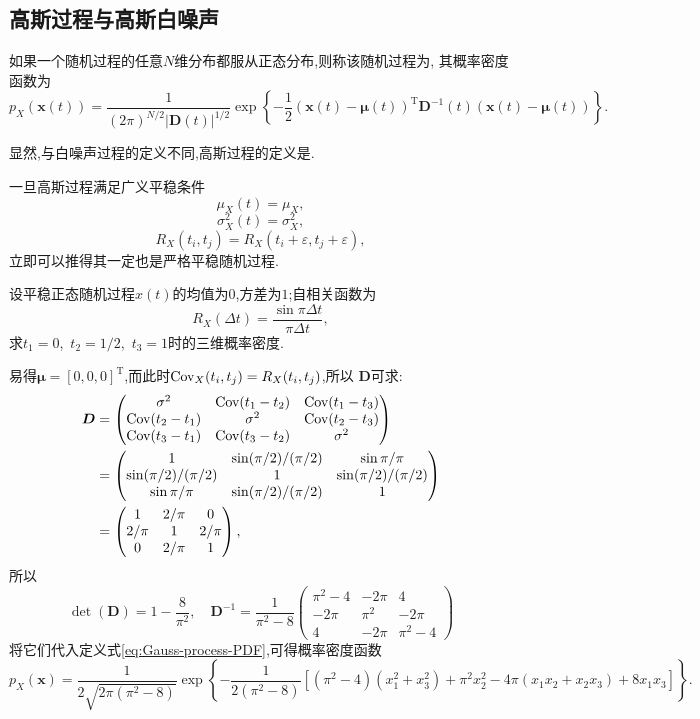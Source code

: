\documentclass[cn,10pt,citestyle=gb7714-2015,bibstyle=gb7714-2015]{elegantbook}
\newcommand{\mT}{\mathrm{T}}
\newcommand{\Cov}{\textup{Cov}}
\begin{document}
\subsection{高斯过程与高斯白噪声}
\begin{definition}[高斯过程]\label{def:Gaussian-process}
  如果一个随机过程的任意$N$维分布都服从正态分布,则称该随机过程为,
  其概率密度函数为
  \begin{equation}\label{eq:Gauss-process-PDF}
    p_X(\bm{x}(t))=\frac{1}{(2\pi)^{N/2}|\bm{D}(t)|^{1/2}}\exp\left\{-\frac12(\bm{x}(t)-\bm{\mu}(t))^\mT\bm{D}^{-1}(t)(\bm{x}(t)-\bm{\mu}(t))\right\}.
  \end{equation}
\end{definition}
\begin{note}
  显然,与白噪声过程的定义不同,高斯过程的定义是.
\end{note}
一旦高斯过程满足广义平稳条件
\[
    \mu_X(t)=\mu_X,
\]
\[
    \sigma_X^2(t)=\sigma_X^2,
\]
\[
    R_X(t_i,t_j)=R_X(t_i+\varepsilon,t_j+\varepsilon),
\]
立即可以推得其一定也是严格平稳随机过程.
\begin{example}
  设平稳正态随机过程$x(t)$的均值为$0$,方差为$1$;自相关函数为
  \[
    R_X(\Delta t)=\frac{\sin\pi\Delta t}{\pi\Delta t},
  \]
  求$t_1=0$,\ $t_2=1/2$,\ $t_3=1$时的三维概率密度.
\end{example}
\begin{solution}
  易得$\bm{\mu}=[0,0,0]^\mT$,而此时$\Cov_X(t_i,t_j)=R_X(t_i,t_j)$,所以
  $\bm{D}$可求:
  \begin{align*}
    \bm{D}&=\begin{pmatrix}
        \sigma^2&\Cov(t_1-t_2)&\Cov(t_1-t_3)\\
        \Cov(t_2-t_1)&\sigma^2&\Cov(t_2-t_3)\\
        \Cov(t_3-t_1)&\Cov(t_3-t_2)&\sigma^2
      \end{pmatrix}\\
      &=\begin{pmatrix}
        1&\sin(\pi/2)/(\pi/2)&\sin\pi/\pi\\
        \sin(\pi/2)/(\pi/2)&1&\sin(\pi/2)/(\pi/2)\\
        \sin\pi/\pi&\sin(\pi/2)/(\pi/2)&1
      \end{pmatrix}\\
      &=\begin{pmatrix}
        1&2/\pi&0\\
        2/\pi&1&2/\pi\\
        0&2/\pi&1
      \end{pmatrix},
  \end{align*}
  所以
  \[
      \det(\bm{D})=1-\frac{8}{\pi^2},\quad\bm{D}^{-1}=\frac{1}{\pi^2-8}\begin{pmatrix}
        \pi^2-4&-2\pi&4\\
        -2\pi&\pi^2&-2\pi\\
        4&-2\pi&\pi^2-4
      \end{pmatrix}
  \]
  将它们代入定义式\eqref{eq:Gauss-process-PDF},可得概率密度函数
  \[
      p_X(\bm{x})=\frac{1}{2\sqrt{2\pi(\pi^2-8)}}\exp\left\{-\frac{1}{2(\pi^2-8)}[(\pi^2-4)(x_1^2+x_3^2)+\pi^2x_2^2-4\pi(x_1x_2+x_2x_3)+8x_1x_3]\right\}.
  \]
\end{solution}
\end{document}
